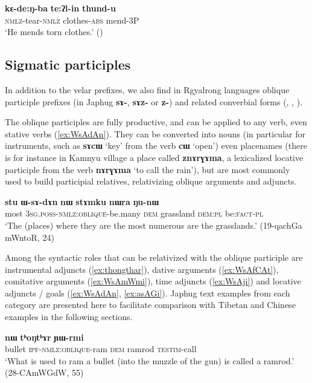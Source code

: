 \documentclass[oneside,a4paper,11pt]{article}
\newcommand{\ipa}[1]{\textbf{{\phon\mbox{#1}}}} %
\begin{document}
\begin{exe}
\ex \label{ex:kEdengba}
 \gll \ipa{kɛ-de:ŋ-ba} \ipa{te:ʔl-in} \ipa{thund-u} \\
 \textsc{nmlz}-tear-\textsc{nmlz} clothes-\textsc{abs} mend-3P \\
 \glt `He mends torn clothes.' (\citealt[201]{driem87})
\end{exe}

\subsection{Sigmatic participles} \label{sec:rgyalrong.sigmatic}
In addition to the velar prefixes, we also find in Rgyalrong languages oblique participle prefixes (in Japhug \ipa{sɤ-}, \ipa{sɤz-} or \ipa{z-}) and related converbial forms (\citet{yanmuchu05sa}, \citealt{jackson14morpho}, \citealt{jacques16relatives}).


The oblique participles are fully productive, and can be applied to any verb, even stative verbs (\ref{ex:WsAdAn}). They can be converted into nouns (in particular for instruments, such as \ipa{sɤcɯ} `key' from the verb \ipa{cɯ} `open') even placenames (there is for instance in Kamnyu village a place called \ipa{znɤrɣɤma}, a lexicalized locative participle from the verb \ipa{nɤrɣɤma} `to call the rain'), but are most commonly used to build participial relatives, relativizing oblique arguments and adjuncts.

\begin{exe}
\ex \label{ex:WsAdAn}
\gll \ipa{stu} 	\ipa{ɯ-sɤ-dɤn} 	\ipa{nɯ} 	\ipa{stɤmku} 	\ipa{nɯra} 	\ipa{ŋu-nɯ}  \\
most \textsc{3sg}.\textsc{poss}-\textsc{nmlz}:\textsc{oblique}-be.many \textsc{dem} grassland \textsc{dem}:\textsc{pl} be:\textsc{fact}-\textsc{pl} \\
\glt `The (places) where they are the most numerous are the grasslands.' (19-qachGa mWntoR, 24)
\end{exe}

Among the syntactic roles that can be relativized with the oblique participle are instrumental adjuncts (\ref{ex:thongthar}), dative arguments (\ref{ex:WsAfCAt}), comitative arguments (\ref{ex:WsAmWmi}), time adjuncts (\ref{ex:WsAji}) and locative adjuncts / goals (\ref{ex:WsAdAn}, \ref{ex:asAGi}). Japhug text examples from each category are presented here to facilitate comparison with Tibetan and Chinese examples in the following sections.

 \begin{exe}
\ex \label{ex:thongthar}
\gll [\ipa{qandʑi}   	\ipa{cʰɯ-sɤ-ɣnda}]   	\ipa{nɯ}   	\ipa{tʰoŋtʰɤr}   	  	\ipa{ɲɯ-rmi}    \\
bullet \textsc{ipf}-\textsc{nmlz:oblique}-ram   \textsc{dem} ramrod \textsc{testim}-call \\
 \glt `What is used to ram a bullet (into the muzzle of the gun) is called a ramrod.' (28-CAmWGdW, 55)
 \end{exe}
 
\end{document}
